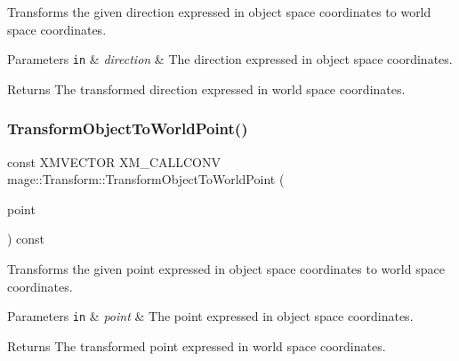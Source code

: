 Transforms the given direction expressed in object space coordinates to world space coordinates.


\begin{DoxyParams}[1]{Parameters}
\mbox{\tt in}  & {\em direction} & The direction expressed in object space coordinates. \\
\hline
\end{DoxyParams}
\begin{DoxyReturn}{Returns}
The transformed direction expressed in world space coordinates. 
\end{DoxyReturn}
\hypertarget{classmage_1_1_transform_ae6a1911525810251aeb563b296f354d6}{}\label{classmage_1_1_transform_ae6a1911525810251aeb563b296f354d6} 
\subsubsection{\texorpdfstring{Transform\+Object\+To\+World\+Point()}{TransformObjectToWorldPoint()}}
{\footnotesize\ttfamily const X\+M\+V\+E\+C\+T\+OR X\+M\+\_\+\+C\+A\+L\+L\+C\+O\+NV mage\+::\+Transform\+::\+Transform\+Object\+To\+World\+Point (\begin{DoxyParamCaption}\item[{F\+X\+M\+V\+E\+C\+T\+OR}]{point }\end{DoxyParamCaption}) const\hspace{0.3cm}{\ttfamily [noexcept]}}

Transforms the given point expressed in object space coordinates to world space coordinates.


\begin{DoxyParams}[1]{Parameters}
\mbox{\tt in}  & {\em point} & The point expressed in object space coordinates. \\
\hline
\end{DoxyParams}
\begin{DoxyReturn}{Returns}
The transformed point expressed in world space coordinates. 
\end{DoxyReturn}
\hypertarget{classmage_1_1_transform_a305841f6bbc0a4eadaacbce2918b438c}{}\label{classmage_1_1_transform_a305841f6bbc0a4eadaacbce2918b438c} 
